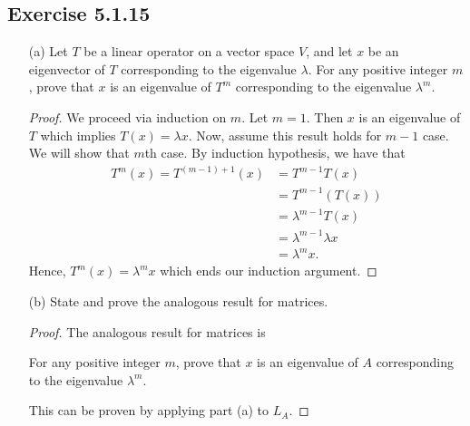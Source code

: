 \subsection*{Exercise 5.1.15}\label{Exercise 5.1.15} 
\begin{enumerate}
    \item[(a)] Let \( T  \) be a linear operator on a vector space \( V  \), and let \( x  \) be an eigenvector of \( T  \) corresponding to the eigenvalue \( \lambda  \). For any positive integer \( m  \), prove that \( x  \) is an eigenvalue of \( T^{m} \) corresponding to the eigenvalue \( \lambda^{m} \).
        \begin{proof}
         We proceed via induction on \( m  \). Let \( m = 1 \). Then \( x  \) is an eigenvalue of \( T  \) which implies \( T(x) = \lambda x  \). Now, assume this result holds for \( m - 1  \) case. We will show that \( m \)th case. By induction hypothesis, we have that  \begin{align*}
             T^{m}(x) = T^{(m-1) + 1}(x) &= T^{m-1} T (x) \\
                                         &= T^{m-1} (T(x)) \\
                                         &= \lambda^{m-1} T(x) \\
                                         &= \lambda^{m-1} \lambda x \\
                                         &= \lambda^{m} x.
         \end{align*}     
         Hence, \( T^{m}(x) = \lambda^{m} x \) which ends our induction argument.
        \end{proof}
    \item[(b)] State and prove the analogous result for matrices.
        \begin{proof}
        The analogous result for matrices is  
        \begin{center}
            For any positive integer \( m  \), prove that \( x  \) is an eigenvalue of \( A \) corresponding to the eigenvalue \( \lambda^{m} \).
        \end{center}
        This can be proven by applying part (a) to \( {L}_{A} \).
        \end{proof}
\end{enumerate}

